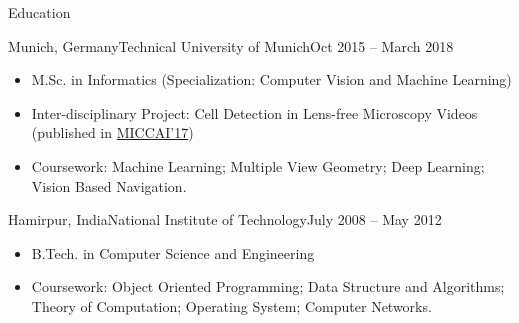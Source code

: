 \documentclass[]{mcdowellcv}
\begin{document}
	
	\makeheader
	
	\begin{cvsection}{Education}
		\begin{cvsubsection}{Munich, Germany}{Technical University of Munich}{Oct 2015 -- March 2018}
			\begin{itemize}
				\item M.Sc. in Informatics (Specialization: Computer Vision and Machine Learning)
				\item Inter-disciplinary Project: Cell Detection in Lens-free Microscopy Videos (published in \href{https://link.springer.com/chapter/10.1007/978-3-319-66185-8_1}{MICCAI'17})
				\item Coursework: Machine Learning; Multiple View Geometry; Deep Learning; Vision Based Navigation.
			\end{itemize}
		\end{cvsubsection}
		\begin{cvsubsection}{Hamirpur, India}{National Institute of Technology}{July 2008 -- May 2012}
			\begin{itemize}
				\item B.Tech. in Computer Science and Engineering
				\item Coursework: Object Oriented Programming; Data Structure and Algorithms; Theory of Computation; Operating System; Computer Networks.
			\end{itemize}
		\end{cvsubsection}
	\end{cvsection}
	
\end{document}
